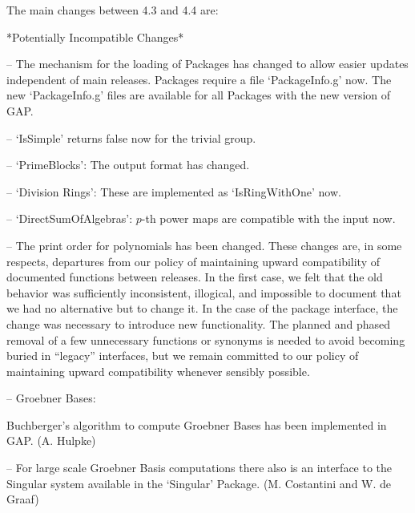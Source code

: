 
The main changes between {\GAP} 4.3 and {\GAP} 4.4 are:

*Potentially Incompatible Changes*

\beginlist%

\item{--}
  The mechanism for the loading of Packages has changed to allow easier
  updates independent of main {\GAP} releases. Packages require a
  file `PackageInfo.g' now. The new `PackageInfo.g' files are available for all
  Packages with the new version of GAP.

\item{--}
  `IsSimple' returns false now for the trivial group.

\item{--}
  `PrimeBlocks': The output format has changed.

\item{--}
  `Division Rings': These are implemented as `IsRingWithOne' now.

\item{--}
  `DirectSumOfAlgebras': $p$-th power maps are compatible with the input now.

\item{--}
  The print order for polynomials has been changed.
\endlist
These changes are, in some respects, departures from our policy of
maintaining upward compatibility of documented functions between
releases. In the first case, we felt that the old behavior was
sufficiently inconsistent, illogical, and impossible to document that
we had no alternative but to change it. In the case of the package
interface, the change
was necessary to introduce new functionality. The planned and phased
removal of a few unnecessary functions or synonyms is needed to avoid
becoming buried in ``legacy'' interfaces, but we remain committed to
our policy of maintaining upward compatibility whenever sensibly possible.


\beginlist%

\item{--}
  Groebner Bases:

    Buchberger's algorithm to compute Groebner Bases has been implemented
    in GAP. (A. Hulpke)

\item{--}
    For large scale Groebner Basis computations there also is an interface
    to the Singular system available in the `Singular' Package.
    (M. Costantini and W. de Graaf)


